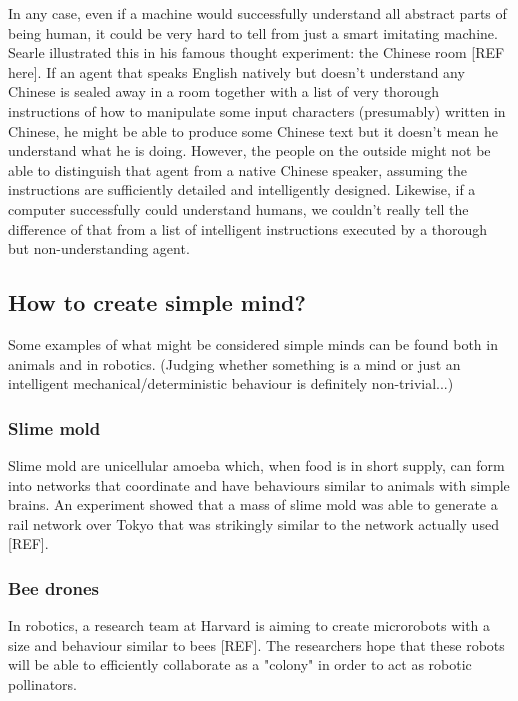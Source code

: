 \documentclass[11pt]{article}
\begin{document}
In any case, even if a machine would successfully understand all abstract parts of being human, it could be very hard to tell from just a smart imitating machine. Searle illustrated this in his famous thought experiment: the Chinese room [REF here]. If an agent that speaks English natively but doesn’t understand any Chinese is sealed away in a room together with a list of very thorough instructions of how to manipulate some input characters (presumably) written in Chinese, he might be able to produce some Chinese text but it doesn’t mean he understand what he is doing. However, the people on the outside might not be able to distinguish that agent from a native Chinese speaker, assuming the instructions are sufficiently detailed and intelligently designed. Likewise, if a computer successfully could understand humans, we couldn’t really tell the difference of that from a list of intelligent instructions executed by a thorough but non-understanding agent.

\subsection{How to create simple mind?}

Some examples of what might be considered simple minds can be found both in animals and in robotics. (Judging whether something is a mind or just an intelligent mechanical/deterministic behaviour is definitely non-trivial...)

\subsubsection{Slime mold}

Slime mold are unicellular amoeba which, when food is in short supply, can form into networks that coordinate and have behaviours similar to animals with simple brains. An experiment showed that a mass of slime mold was able to generate a rail network over Tokyo that was strikingly similar to the network actually used [REF].

\subsubsection{Bee drones}

In robotics, a research team at Harvard is aiming to create microrobots with a size and behaviour similar to bees [REF]. The researchers hope that these robots will be able to efficiently collaborate as a "colony" in order to act as robotic pollinators.
\end{document}
